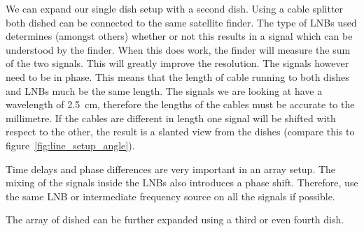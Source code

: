 \documentclass[12pt,a4paper]{article}
\numberwithin{equation}{section}
\numberwithin{figure}{section}
\numberwithin{table}{section}
\begin{document}
We can expand our single dish setup with a second dish. Using a cable splitter both dished can be connected to the same satellite finder. The type of LNBs used determines (amongst others) whether or not this results in a signal which can be understood by the finder. When this does work, the finder will measure the sum of the two signals. This will greatly improve the resolution. The signals however need to be in phase. This means that the length of cable running to both dishes and LNBs much be the same length. The signals we are looking at have a wavelength of 2.5~cm, therefore the lengths of the cables must be accurate to the millimetre. If the cables are different in length one signal will be shifted with respect to the other, the result is a slanted view from the dishes (compare this to figure~\ref{fig:line_setup_angle}).

Time delays and phase differences are very important in an array setup. The mixing of the signals inside the LNBs also introduces a phase shift. Therefore, use the same LNB or intermediate frequency source on all the signals if possible. 

The array of dished can be further expanded using a third or even fourth dish. 
\end{document}
